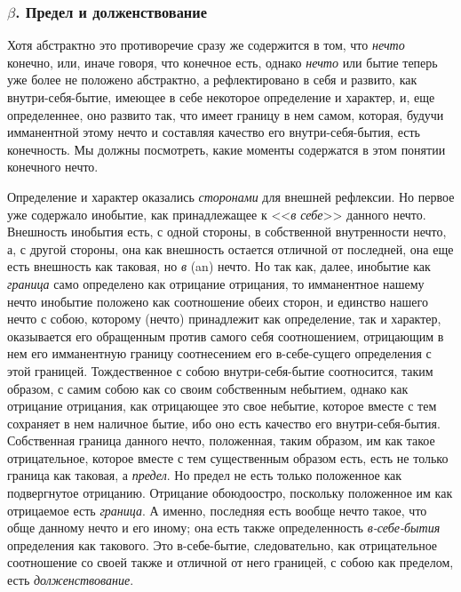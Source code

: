\bigskip

\subsubsection[$\beta $. Предел и долженствование]{$\beta $. Предел и долженствование}

Хотя абстрактно это противоречие сразу же содержится в том, что
{\em нечто} конечно, или, иначе говоря, что конечное
есть, однако {\em нечто} или бытие теперь уже более не
положено абстрактно, а рефлектировано в себя и развито, как
внутри-себя-бытие, имеющее в себе некоторое определение и характер, и, еще
определеннее, оно развито так, что имеет границу в нем самом, которая,
будучи имманентной этому нечто и составляя качество его внутри-себя-бытия,
есть конечность. Мы должны посмотреть, какие моменты содержатся в этом
понятии конечного нечто.

Определение и характер оказались {\em сторонами} для
внешней рефлексии. Но первое уже содержало инобытие, как принадлежащее к
<<{\em в себе}>> данного нечто. Внешность инобытия есть,
с одной стороны, в собственной внутренности нечто, а, с другой стороны, она
как внешность остается отличной от последней, она еще есть внешность как
таковая, но {\em в} (an) нечто. Но так как, далее,
инобытие как {\em граница} само определено как
отрицание отрицания, то имманентное нашему нечто инобытие положено как
соотношение обеих сторон, и единство нашего нечто с собою, которому (нечто)
принадлежит как определение, так и характер, оказывается его обращенным
против самого себя соотношением, отрицающим в нем его имманентную границу
соотнесением его в-себе-сущего определения с этой границей. Тождественное с
собою внутри-себя-бытие соотносится, таким образом, с самим собою как со
своим собственным небытием, однако как отрицание отрицания, как отрицающее
это свое небытие, которое вместе с тем сохраняет в нем наличное бытие, ибо
оно есть качество его внутри-себя-бытия. Собственная граница данного нечто,
положенная, таким образом, им как такое отрицательное, которое вместе с тем
существенным образом есть, есть не только граница как таковая, а
{\em предел}. Но предел не есть только положенное как
подвергнутое отрицанию. Отрицание обоюдоостро, поскольку положенное им как
отрицаемое есть {\em граница}. А именно, последняя есть
вообще нечто такое, что обще данному нечто и его иному; она есть также
определенность {\em в-себе-бытия} определения как
такового. Это в-себе-бытие, следовательно, как отрицательное соотношение со
своей также и отличной от него границей, с собою как пределом, есть
{\em долженствование}.

